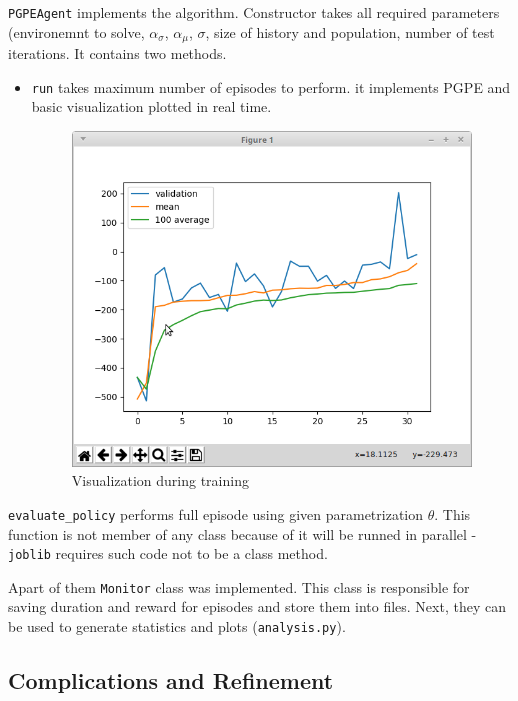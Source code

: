 \documentclass[12pt]{article}
\begin{document}
\texttt{PGPEAgent} implements the algorithm. Constructor takes all required parameters (environemnt to solve, $\alpha_\sigma$, $\alpha_\mu$, $\sigma$, size of history and population, number of test iterations. It contains two methods.

\begin{itemize}

\item \texttt{run} takes maximum number of episodes to perform. it implements PGPE and basic visualization plotted in real time.

\begin{figure}[h]
\centering
\includegraphics[scale=0.5]{monitor.png} 
\caption{Visualization during training}
\end{figure}

\end{itemize}

\texttt{evaluate\_policy} performs full episode using given parametrization $\theta$. This function is not member of any class because of it will be runned in parallel - \texttt{joblib} requires such code  not to be a class method.

Apart of them \texttt{Monitor} class was implemented. This class is responsible for saving duration and reward for episodes and store them into files. Next, they can be used to generate statistics and plots (\texttt{analysis.py}).

\subsection{Complications and Refinement}
\end{document}
